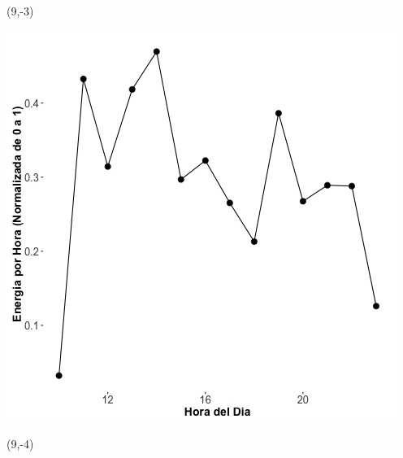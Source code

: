 \documentclass{article}\usepackage[]{graphicx}\usepackage[]{color}
\newenvironment{knitrout}{}{} %
\begin{document}
 \begin{textblock}{1}(9,-3)
\begin{minipage}{20em}
\begingroup

\endgroup
\end{minipage}
\end{textblock}

 \vspace{2cm}

\begin{knitrout}
\color{fgcolor}
\includegraphics[scale=0.75]{figure/A11_fplot_norm_median} 
\end{knitrout}


 \begin{textblock}{1}(9,-4)
\begin{minipage}{20em}
\begingroup

\endgroup
\end{minipage}
\end{textblock}

 \vspace{2cm}
\end{document}
